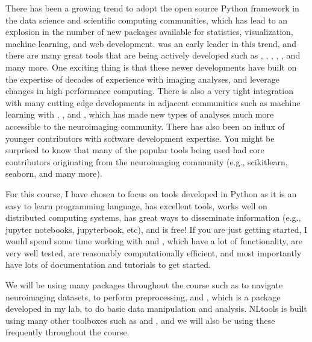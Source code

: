 \documentclass[letterpaper,10pt,english]{sphinxmanual}
\begin{document}
There has been a growing trend to adopt the open source Python framework in the data science and scientific computing communities, which has lead to an explosion in the number of new packages available for statistics, visualization, machine learning, and web development.  was an early leader in this trend, and there are many great tools that are being actively developed such as , , , , , and many more. One exciting thing is that these newer developments have built on the expertise of decades of experience with imaging analyses, and leverage changes in high performance computing. There is also a very tight integration with many cutting edge developments in adjacent communities such as machine learning with , , and , which has made new types of analyses much more accessible to the neuroimaging community. There has also been an influx of younger contributors with software development expertise. You might be surprised to know that many of the popular tools being used had core contributors originating from the neuroimaging community (e.g., scikit\sphinxhyphen{}learn, seaborn, and many more).

For this course, I have chosen to focus on tools developed in Python as it is an easy to learn programming language, has excellent tools, works well on distributed computing systems, has great ways to disseminate information (e.g., jupyter notebooks, jupyter\sphinxhyphen{}book, etc), and is free! If you are just getting started, I would spend some time working with  and , which have a lot of functionality, are very well tested, are reasonably computationally efficient, and most importantly have lots of documentation and tutorials to get started.

We will be using many packages throughout the course such as  to navigate neuroimaging datasets,  to perform preprocessing, and , which is a package developed in my lab, to do basic data manipulation and analysis. NLtools is built using many other toolboxes such as  and , and we will also be using these frequently throughout the course.
\end{document}
